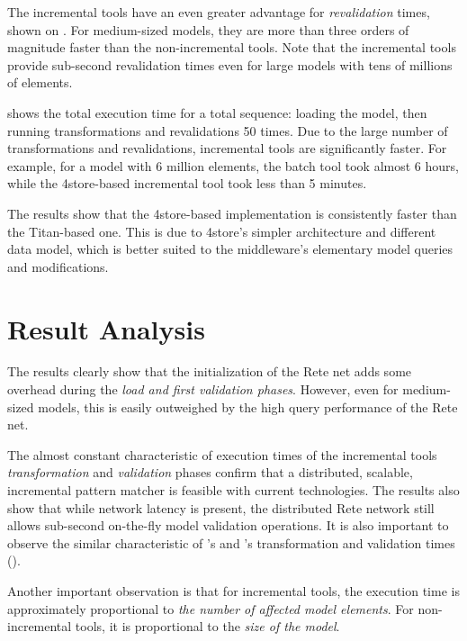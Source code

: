 The incremental tools have an even greater advantage for \emph{revalidation} times, shown on . For medium-sized models, they are more than three orders of magnitude faster than the non-incremental tools. Note that the incremental tools provide sub-second revalidation times even for large models with tens of millions of elements.


 shows the total execution time for a total sequence: loading the model, then running transformations and revalidations 50 times. Due to the large number of transformations and revalidations, incremental tools are significantly faster. For example, for a model with 6 million elements, the batch tool took almost 6 hours, while the 4store-based incremental tool took less than 5 minutes. 

The results show that the 4store-based \iqd{} implementation is consistently faster than the Titan-based one. This is due to 4store's simpler architecture and different data model, which is better suited to the \iqd{} middleware's elementary model queries and modifications.

\section{Result Analysis}

The results clearly show that the initialization of the Rete net adds some overhead during the \emph{load and first validation phases}. However, even for medium-sized models, this is easily outweighed by the high query performance of the Rete net.

The almost constant characteristic of execution times of the incremental tools \emph{transformation} and \emph{validation} phases confirm that a distributed, scalable, incremental pattern matcher is feasible with current technologies. The results also show that while network latency is present, the distributed Rete network still allows sub-second on-the-fly model validation operations. It is also important to observe the similar characteristic of \iqd{}'s and \eiq{}'s transformation and validation times ().

Another important observation is that for incremental tools, the execution time is approximately proportional to \emph{the number of affected model elements}. For non-incremental tools, it is proportional to the \emph{size of the model}. 

